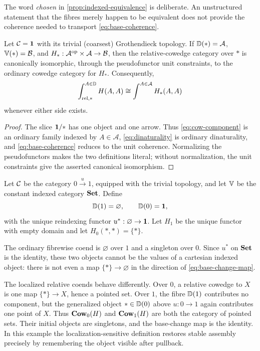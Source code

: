 The word \emph{chosen} in \cref{prop:indexed-equivalence} is deliberate.  An
unstructured statement that the fibres merely happen to be equivalent does
not provide the coherence needed to transport \cref{eq:base-coherence}.

\begin{proposition}
\label{prop:terminal-reduction}
Let \(\mathcal{C}=\mathbf{1}\) with its trivial (coarsest) Grothendieck topology.  If
\(\mathbb{D}(*)=\mathcal A\), \(\mathbb{V}(*)=\mathcal B\), and
\(H_*:\mathcal A^{\mathrm{op}}\times\mathcal A\to\mathcal B\), then the
relative-cowedge category over \(*\) is canonically isomorphic, through the
pseudofunctor unit constraints, to the ordinary cowedge category for \(H_*\).
Consequently,
\[
  \mathop{\int^{A\in\mathbb{D}}_{\mathrm{rel},*}}H(A,A)
  \cong
  \int^{A\in\mathcal A}H_*(A,A)
\]
whenever either side exists.
\end{proposition}

\begin{proof}
The slice \(\mathbf{1}/*\) has one object and one arrow.  Thus
\cref{eq:cow-component} is an ordinary family indexed by
\(A\in\mathcal A\), \cref{eq:dinaturality} is ordinary dinaturality, and
\cref{eq:base-coherence} reduces to the unit coherence.  Normalizing the
pseudofunctors makes the two definitions literal; without normalization,
the unit constraints give the asserted canonical isomorphism.
\end{proof}

\begin{example}
\label{ex:fibrewise-failure}
Let \(\mathcal{C}\) be the category \(0\xrightarrow{u}1\), equipped with the trivial
topology, and let \(\mathbb{V}\) be the constant indexed category \(\mathbf{Set}\).  Define
\[
  \mathbb{D}(1)=\varnothing,
  \qquad
  \mathbb{D}(0)=\mathbf{1},
\]
with the unique reindexing functor \(u^*:\varnothing\to\mathbf{1}\).  Let
\(H_1\) be the unique functor with empty domain and let
\(H_0(*,*)=\{*\}\).

The ordinary fibrewise coend is \(\varnothing\) over \(1\) and a singleton
over \(0\).  Since \(u^*\) on \(\mathbf{Set}\) is the identity, these two objects
cannot be the values of a cartesian indexed object: there is not even a map
\(\{*\}\to\varnothing\) in the direction of \cref{eq:base-change-map}.

The localized relative coends behave differently.  Over \(0\), a relative
cowedge to \(X\) is one map \(\{*\}\to X\), hence a pointed set.  Over \(1\),
the fibre \(\mathbb{D}(1)\) contributes no component, but the generalized object
\(*\in\mathbb{D}(0)\) above \(u:0\to1\) again contributes one point of \(X\).
Thus \(\mathbf{Cow}_0(H)\) and \(\mathbf{Cow}_1(H)\) are both the category of pointed sets.
Their initial objects are singletons, and the base-change map is the identity.
In this example the localization-sensitive definition restores stable
assembly precisely by remembering the object visible after pullback.
\end{example}


